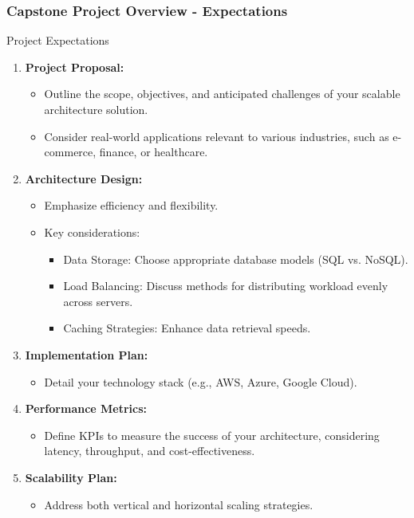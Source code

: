 \documentclass[aspectratio=169]{beamer}
\begin{document}
\begin{frame}[fragile]
    \frametitle{Capstone Project Overview - Expectations}
    \begin{block}{Project Expectations}
        \begin{enumerate}
            \item \textbf{Project Proposal:}
                \begin{itemize}
                    \item Outline the scope, objectives, and anticipated challenges of your scalable architecture solution.
                    \item Consider real-world applications relevant to various industries, such as e-commerce, finance, or healthcare.
                \end{itemize}
            \item \textbf{Architecture Design:}
                \begin{itemize}
                    \item Emphasize efficiency and flexibility.
                    \item Key considerations:
                        \begin{itemize}
                            \item Data Storage: Choose appropriate database models (SQL vs. NoSQL).
                            \item Load Balancing: Discuss methods for distributing workload evenly across servers.
                            \item Caching Strategies: Enhance data retrieval speeds.
                        \end{itemize}
                \end{itemize}
            \item \textbf{Implementation Plan:}
                \begin{itemize}
                    \item Detail your technology stack (e.g., AWS, Azure, Google Cloud).
                \end{itemize}
            \item \textbf{Performance Metrics:}
                \begin{itemize}
                    \item Define KPIs to measure the success of your architecture, considering latency, throughput, and cost-effectiveness.
                \end{itemize}
            \item \textbf{Scalability Plan:}
                \begin{itemize}
                    \item Address both vertical and horizontal scaling strategies.
                \end{itemize}
        \end{enumerate}
    \end{block}
\end{frame}
\end{document}
